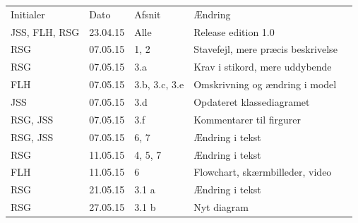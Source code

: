 \documentclass[12pt,a4paper]{article}
\begin{document}
\begin{table}[h]
\begin{tabular}{lllll}
\cline{1-4}
\multicolumn{1}{|l|}{Initialer} & \multicolumn{1}{l|}{Dato} & \multicolumn{1}{l|}{Afsnit} & \multicolumn{1}{l|}{Ændring} &  \\ \cline{1-4}
\multicolumn{1}{|l|}{JSS, FLH, RSG}     & \multicolumn{1}{l|}{23.04.15}     & \multicolumn{1}{l|}{Alle}       & \multicolumn{1}{l|}{Release edition 1.0}        &  \\ \cline{1-4}
\multicolumn{1}{|l|}{RSG}     & \multicolumn{1}{l|}{07.05.15}     & \multicolumn{1}{l|}{1, 2}       & \multicolumn{1}{l|}{Stavefejl, mere præcis beskrivelse}        &  \\ \cline{1-4}
\multicolumn{1}{|l|}{RSG}     & \multicolumn{1}{l|}{07.05.15}     & \multicolumn{1}{l|}{3.a}       & \multicolumn{1}{l|}{Krav i stikord, mere uddybende}        &  \\ \cline{1-4}
\multicolumn{1}{|l|}{FLH}     & \multicolumn{1}{l|}{07.05.15}     & \multicolumn{1}{l|}{3.b, 3.c, 3.e}       & \multicolumn{1}{l|}{Omskrivning og ændring i model}        &  \\ \cline{1-4}
\multicolumn{1}{|l|}{JSS}     & \multicolumn{1}{l|}{07.05.15}     & \multicolumn{1}{l|}{3.d}       & \multicolumn{1}{l|}{Opdateret klassediagramet}        &  \\ \cline{1-4}
\multicolumn{1}{|l|}{RSG, JSS}     & \multicolumn{1}{l|}{07.05.15}     & \multicolumn{1}{l|}{3.f}       & \multicolumn{1}{l|}{Kommentarer til firgurer}        &  \\ \cline{1-4}
\multicolumn{1}{|l|}{RSG, JSS}     & \multicolumn{1}{l|}{07.05.15}     & \multicolumn{1}{l|}{6, 7}       & \multicolumn{1}{l|}{Ændring i tekst}        &  \\ \cline{1-4}
\multicolumn{1}{|l|}{RSG}     & \multicolumn{1}{l|}{11.05.15}     & \multicolumn{1}{l|}{4, 5, 7}       & \multicolumn{1}{l|}{Ændring i tekst}        &  \\ \cline{1-4}
\multicolumn{1}{|l|}{FLH}     & \multicolumn{1}{l|}{11.05.15}     & \multicolumn{1}{l|}{6}       & \multicolumn{1}{l|}{Flowchart, skærmbilleder, video}        &  \\ \cline{1-4}
\multicolumn{1}{|l|}{RSG}     & \multicolumn{1}{l|}{21.05.15}     & \multicolumn{1}{l|}{3.1 a}       & \multicolumn{1}{l|}{Ændring i tekst}        &  \\ \cline{1-4}
\multicolumn{1}{|l|}{RSG}     & \multicolumn{1}{l|}{27.05.15}     & \multicolumn{1}{l|}{3.1 b}       & \multicolumn{1}{l|}{Nyt diagram}        &  \\ \cline{1-4}

\end{tabular}
\end{table}
\end{document}
